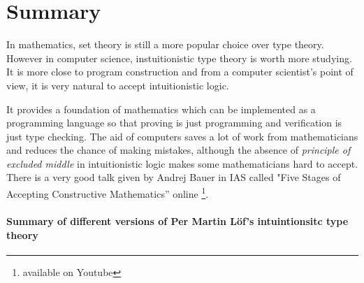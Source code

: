 




\section{Summary}


In mathematics, set theory is still a more popular choice over type theory. However in computer science, instuitionistic type theory is worth more studying. It is more close to program construction and from a computer scientist's point of view, it is very natural to accept intuitionistic logic. 

It provides a foundation of mathematics which can be implemented as a programming language so that proving is just programming and verification is just type checking. The aid of computers saves a lot of work from mathematicians and reduces the chance of making mistakes, although the absence of \emph{principle of excluded middle} in intuitionistic logic makes some mathematicians hard to accept. There is a very good talk given by Andrej Bauer in IAS called "Five Stages of Accepting Constructive Mathematics'' online \footnote{available on Youtube}.

\paragraph{Summary of different versions of Per Martin L\"{o}f's intuintionsitc type theory}

